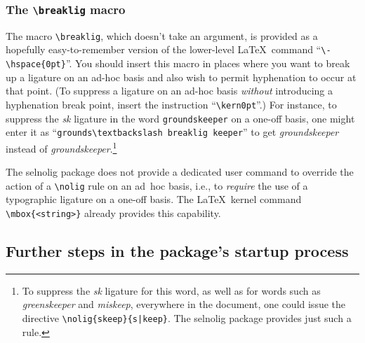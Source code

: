 \documentclass[11pt]{article}
\newcommand{\pkg}[1]{\textsf{#1}}
\newcommand{\cmmd}[1]{\texttt{\textbackslash #1}}
\begin{document}
\subsubsection{The \cmmd{breaklig} macro} 
\label{sec:breaklig}

The macro \cmmd{breaklig}, which doesn't take an argument, is provided as a hopefully easy-to-remember version of the lower-level \LaTeX\ command ``\Verb+\-\hspace{0pt}+''. You should insert this macro in places where you want to break up a ligature on an ad-hoc basis and also wish to permit hyphenation to occur at that point. (To suppress a ligature on an ad-hoc basis \emph{without} introducing a hyphenation break point, insert the instruction \enquote{\cmmd{kern0pt}}.) For instance, to suppress the {\ebg\emph{sk}} ligature in the word \Verb+groundskeeper+ on a one-off basis, one might enter it as \enquote{\Verb+grounds\textbackslash breaklig keeper+} to get \emph{\ebg groundskeeper} instead of \emph{\ebg ground\mbox{sk}eeper}.\footnote{To suppress the {\ebg \emph{sk}} ligature for this word, as well as for words such as \emph{\ebg greenskeeper} and \emph{\ebg miskeep}, everywhere in the document, one could issue the directive \Verb+\nolig{skeep}{s|keep}+. The \pkg{selnolig} package provides just such a rule.}


The \pkg{selnolig} package does not provide a dedicated user command to override the action of a \cmmd{nolig} rule on an ad~hoc basis, i.e., to \emph{require} the use of a typographic ligature on a one-off basis. The \LaTeX\ kernel command \Verb+\mbox{<string>}+ already provides this capability.


\subsection{Further steps in the package's startup process}
\end{document}
